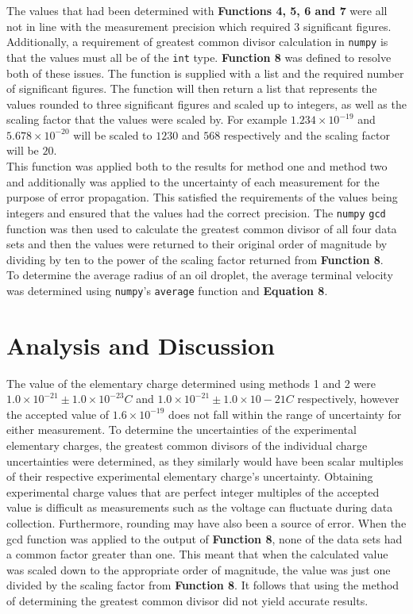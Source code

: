 \documentclass[
	letterpaper, %
	10pt, %
]{CSUniSchoolLabReport}
\begin{document}
The values that had been determined with \textbf{Functions 4, 5, 6 and 7} were all not in line with the measurement precision
which required 3 significant figures. Additionally, a requirement of greatest common divisor calculation in \lstinline{numpy} is that the
values must all be of the \lstinline{int} type. \textbf{Function 8} was defined to resolve both of these issues.
The function is supplied with a list and the required number of significant figures. The function will then return a list that
represents the values rounded to three significant figures and scaled up to integers, as well as the scaling factor that
the values were scaled by. For example $1.234\times10^{-19}$ and $5.678\times 10^{-20}$ will be scaled to $1230$ and $568$
respectively and the scaling factor will be $20$. \\

This function was applied both to the results for method one and method two and additionally was applied to the uncertainty of each
measurement for the purpose of error propagation. This satisfied the requirements of the values being integers and ensured that
the values had the correct precision. The \lstinline{numpy} \lstinline{gcd} function was then used to calculate the greatest common
divisor of all four data sets and then the values were returned to their original order of magnitude by dividing by ten to the power
of the scaling factor returned from \textbf{Function 8}.\\


To determine the average radius of an oil droplet, the average terminal velocity was determined using \lstinline{numpy}'s
\lstinline{average} function and \textbf{Equation 8}.
\newpage


\section{Analysis and Discussion}
The value of the elementary charge determined using methods 1 and 2 were
$1.0\times 10^{-21}\pm 1.0\times 10^{-23}C$ and $1.0\times 10^{-21}\pm 1.0\times 10-21C$
respectively, however the accepted value of $1.6\times 10^{-19}$ does not fall within the range of uncertainty for
either measurement. To determine the uncertainties of the experimental elementary charges, the greatest common
divisors of the individual charge uncertainties were determined, as they similarly would have been scalar multiples
of their respective experimental elementary charge's uncertainty. Obtaining experimental charge values that are perfect
integer multiples of the accepted value is difficult as measurements such as the voltage can fluctuate during data
collection. Furthermore, rounding may have also been a source of error. When the gcd function was applied to the output of
\textbf{Function 8}, none of the data sets had a common factor greater than one. This meant that when the calculated value
was scaled down to the appropriate order of magnitude, the value was just one divided by the scaling factor from \textbf{Function 8}.
It follows that using the method of determining the greatest common divisor did not yield accurate results.\\
\end{document}
